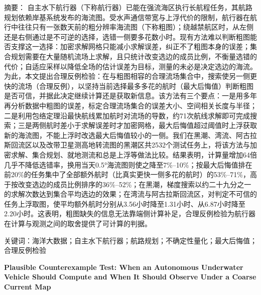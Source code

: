 {\heiti 摘要：}
自主水下航行器（下称航行器）已能在强流海区执行长航程任务，其航路规划依赖岸基系统发布的海流图。受水声通信带宽与上浮代价的限制，航行器在航行中往往只有一张数天前的粗分辨率海流图（下称粗图）；绕越禁航区时，从左侧还是右侧通过是不可逆的选择，选错一侧要多花数小时。现有方法难以判断粗图能否支撑这一选择：加密求解网格只能减小求解误差，纠正不了粗图本身的误差；集合规划需要在大量随机流场上求解，且只统计改变选边的成员比例，不衡量选错的代价；自适应采样以降低全场的估计误差为目标，测量的未必是决定选边的海流。为此，本文提出合理反例检验：在与粗图相容的合理流场集合中，搜索使另一侧更快的流场（合理反例），以坚持当前选择最多多花的航时（最大后悔值）判断粗图是否可信，并据此决定继续计算还是获取新信息。该方法有三个要点：一是用多年再分析数据中粗图的误差，标定合理流场集合的误差大小、空间相关长度与半径；二是利用包络定理沿最快航线累加航时对流场的导数，约71次航线求解即可完成搜索；三是两侧航时差小于求解误差时才加密网格，最大后悔值超过阈值时上浮获取新的海流图，不能上浮时改选最大后悔值较小的一侧。我们在黑潮、湾流、阿古拉斯回流区以及改带卫星测高地转流图的黑潮区共2532个测试任务上，将该方法与加密求解、集合规划、就地测流和总是上浮等做法比较。结果表明，计算量增加64倍几乎不降低选错率，换用当天0.5°海流图则使之降至7\%--10\%；按最大后悔值排在前20\%的任务集中了全部额外航时（比真实更快一侧多花的航时）的53\%--71\%，高于按改变选边的成员比例排序的36\%--52\%；在黑潮，梯度搜索以约二十九分之一的求解次数达到集合平均选边的效果；在湾流与阿古拉斯回流区，对判定不可信的任务上浮取图，使平均额外航时分别从3.56小时降至1.31小时、从6.87小时降至2.20小时。这表明，粗图缺失的信息无法靠端侧计算补足，合理反例检验为航行器在计算与观测之间的取舍提供了可计算的判据。

{\heiti 关键词：}海洋大数据；自主水下航行器；航路规划；不确定性量化；最大后悔值；合理反例检验

\vspace{1em}
\begin{center}
{\large\bfseries Plausible Counterexample Test: When an Autonomous Underwater Vehicle Should Compute and When It Should Observe Under a Coarse Current Map}
\end{center}
\vspace{0.5em}

